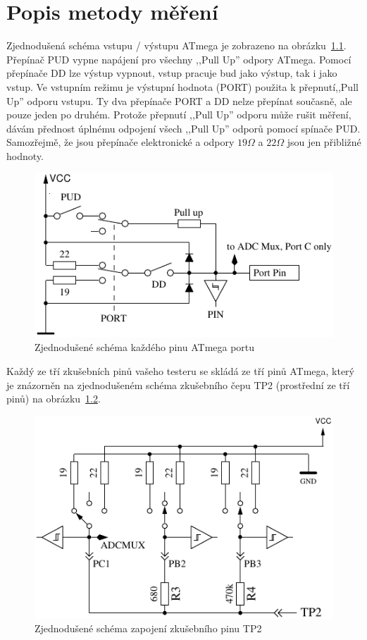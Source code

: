 \chapter{Popis metody měření}
\label{sec:measurement}
Zjednodušená schéma vstupu / výstupu ATmega je zobrazeno na obrázku~\ref{fig:port}.
Přepínač PUD vypne napájení pro všechny ,,Pull Up'' odpory ATmega.
Pomocí přepínače DD lze výstup vypnout, vstup pracuje bud jako výstup, tak i jako vstup.
Ve vstupním režimu je výstupní hodnota (PORT) použita k přepnutí,,Pull Up'' odporu vstupu.
Ty dva přepínače PORT a DD nelze přepínat současně, ale pouze jeden po druhém.
Protože přepnutí ,,Pull Up'' odporu může rušit měření, dávám přednost úplnému
odpojení všech  ,,Pull Up'' odporů pomocí spínače PUD.
Samozřejmě, že jsou přepínače elektronické a odpory \(19\Omega\) a \(22\Omega\) jsou jen přibližné hodnoty.

\begin{figure}[H]
\centering
\includegraphics[width=.8\textwidth]{../FIG/port.pdf}
\caption{Zjednodušené schéma každého pinu ATmega portu}
\label{fig:port}
\end{figure}

Každý ze tří zkušebních pinů vašeho testeru se skládá ze tří pinů ATmega,
který je znázorněn na zjednodušeném schéma zkušebního čepu TP2 (prostřední ze tří pinů) na obrázku~\ref{fig:terminal}.

\begin{figure}[H]
\centering
\includegraphics[width=.8\textwidth]{../FIG/terminal.pdf}
\caption{Zjednodušené schéma zapojení zkušebního pinu TP2}
\label{fig:terminal}
\end{figure}

